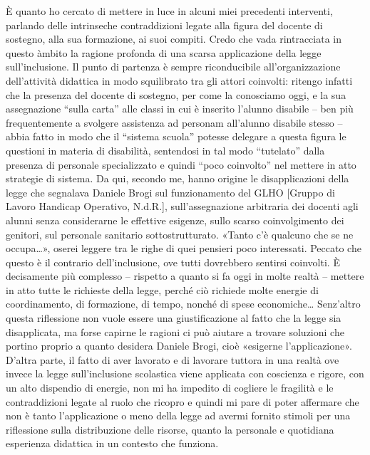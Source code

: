 È quanto ho cercato di mettere in luce in alcuni miei precedenti interventi, parlando delle intrinseche contraddizioni legate alla figura del docente di sostegno, alla sua formazione, ai suoi compiti. Credo che vada rintracciata in questo àmbito la ragione profonda di una scarsa applicazione della legge sull'inclusione.
Il punto di partenza è sempre riconducibile all'organizzazione dell'attività didattica in modo squilibrato tra gli attori coinvolti: ritengo infatti che la presenza del docente di sostegno, per come la conosciamo oggi, e la sua assegnazione “sulla carta” alle classi in cui è inserito l'alunno disabile – ben più frequentemente a svolgere assistenza ad personam all'alunno disabile stesso – abbia fatto in modo che il “sistema scuola” potesse delegare a questa figura le questioni in materia di disabilità, sentendosi in tal modo “tutelato” dalla presenza di personale specializzato e quindi “poco coinvolto” nel mettere in atto strategie di sistema.
Da qui, secondo me, hanno origine le disapplicazioni della legge che segnalava Daniele Brogi sul funzionamento del GLHO [Gruppo di Lavoro Handicap Operativo, N.d.R.], sull'assegnazione arbitraria dei docenti agli alunni senza considerarne le effettive esigenze, sullo scarso coinvolgimento dei genitori, sul personale sanitario sottostrutturato. «Tanto c'è qualcuno che se ne occupa…», oserei leggere tra le righe di quei pensieri poco interessati. Peccato che questo è il contrario dell'inclusione, ove tutti dovrebbero sentirsi coinvolti.
È decisamente più complesso – rispetto a quanto si fa oggi in molte realtà – mettere in atto tutte le richieste della legge, perché ciò richiede molte energie di coordinamento, di formazione, di tempo, nonché di spese economiche…  Senz'altro questa riflessione non vuole essere una giustificazione al fatto che la legge sia disapplicata, ma forse capirne le ragioni ci può aiutare a trovare soluzioni che portino proprio a quanto desidera Daniele Brogi, cioè «esigerne l'applicazione».
D'altra parte, il fatto di aver lavorato e di lavorare tuttora in una realtà ove invece la legge sull'inclusione scolastica viene applicata con coscienza e rigore, con un alto dispendio di energie, non mi ha impedito di cogliere le fragilità e le contraddizioni legate al ruolo che ricopro e quindi mi pare di poter affermare che non è tanto l'applicazione o meno della legge ad avermi fornito stimoli per una riflessione sulla distribuzione delle risorse, quanto la personale e quotidiana esperienza didattica in un contesto che funziona.

